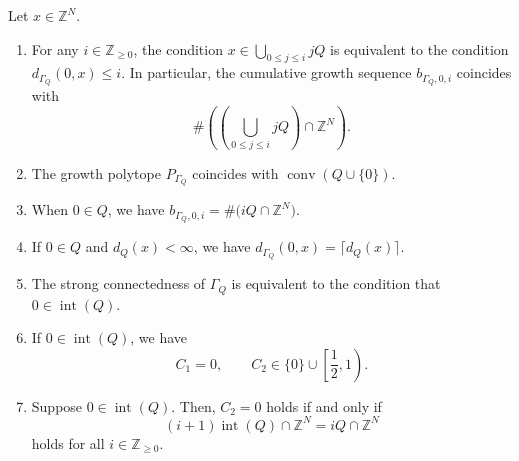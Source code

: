 \documentclass[ALCO,published]{cedram}
\theoremstyle{remark}
\begin{document}
\begin{lem}\label{lem:PG}
Let $x \in \mathbb{Z}^N$. 
\begin{enumerate}
\item 
For any $i \in \mathbb{Z}_{\ge 0}$, 
the condition $x \in \bigcup _{0 \le j \le i} jQ$ is equivalent to the condition $d_{\Gamma _Q}(0,x) \le i$. 
In particular, the cumulative growth sequence $b_{\Gamma _Q, 0, i}$ coincides with 
\[
\# \left( \left( \bigcup _{0 \le j \le i} jQ \right) \cap \mathbb{Z}^N \right).
\]

\item
The growth polytope $P_{\Gamma _{Q}}$ coincides with $\operatorname{conv} (Q \cup \{ 0 \})$. 


\item 
When $0 \in Q$, we have $b_{\Gamma _Q, 0, i} = \# \bigl( iQ \cap \mathbb{Z}^N \bigr)$. 


\item 
If $0 \in Q$ and $d_Q(x) < \infty$, we have $d_{\Gamma _Q}(0, x) = \lceil d_Q(x) \rceil$. 

\item
The strong connectedness of $\Gamma _Q$ is equivalent to the condition that $0 \in \operatorname{int}(Q)$. 

\item 
If $0 \in \operatorname{int}(Q)$, we have 
\[
C_1 = 0, \qquad C_2 \in \{0\} \cup \left[ \frac{1}{2}, 1 \right). 
\]

\item
Suppose $0 \in \operatorname{int}(Q)$. 
Then, $C_2 = 0$ holds if and only if
\[
(i+1) \operatorname{int}(Q) \cap \mathbb{Z}^N = iQ \cap \mathbb{Z}^N
\]
holds for all $i \in \mathbb{Z}_{\ge 0}$. 
\end{enumerate}
\end{lem}
\end{document}
